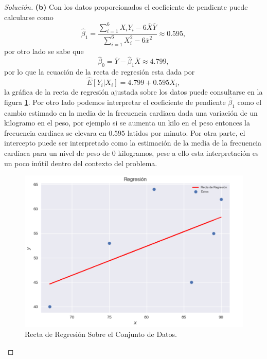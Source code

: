 \documentclass[10.5pt,notitlepage]{article}
\newenvironment{solucion}
  {\begin{proof}[Solución]}
  {\end{proof}}
\begin{document}
\begin{solucion}
\noindent\textbf{(b)} Con los datos proporcionados el coeficiente de pendiente puede calcularse como 
\begin{equation}\label{b1}
    \hat{\beta}_1= \frac{\sum_{i=1}^{6}X_iY_i - 6 \overline{X} \overline{Y}}{\sum_{i=1}^{6}X_{i}^2 - 6\overline{x}^2} \approx 0.595,
\end{equation}
por otro lado se sabe que 
\begin{equation}\label{b2}
    \hat{\beta}_0 = \overline{Y} - \hat{\beta}_1\overline{X} \approx 4.799,
\end{equation}
por lo que la ecuación de la recta de regresión esta dada por 
\begin{equation}\label{b3}
   \widehat{E}[Y_i|X_i] = 4.799 +  0.595 X_i,  
\end{equation}
la gráfica de la recta de regresión ajustada sobre los datos puede consultarse en la figura \ref{fig:RLineal2}. Por otro lado podemos interpretar el coeficiente de pendiente \(\hat{\beta}_1\) como el cambio estimado en la media de la frecuencia cardiaca dada una variación de un kilogramo en el peso, por ejemplo si se aumenta un kilo en el peso entonces la frecuencia cardiaca se elevara en \(0.595\) latidos por minuto. Por otra parte, el intercepto puede ser interpretado como la estimación de la media de la frecuencia cardiaca para un nivel de peso de \(0\) kilogramos, pese a ello esta interpretación es un poco inútil dentro del contexto del problema. 
  \begin{figure}[htb]
 \centering
 \includegraphics[scale = 0.6]{Relación lineal 2.png}
 \caption{Recta de Regresión Sobre el Conjunto de Datos.}
 \label{fig:RLineal2}
 \end{figure}



\end{solucion}
\end{document}
